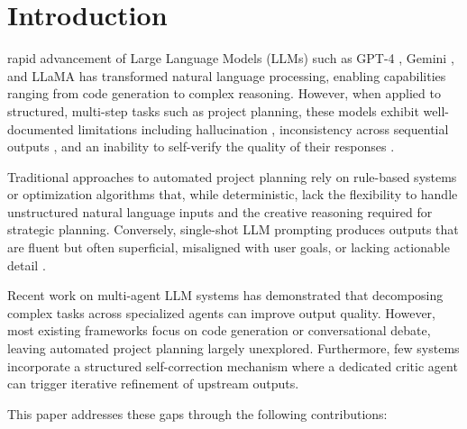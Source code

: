 \documentclass[journal]{IEEEtran}
\begin{document}
\section{Introduction}

 rapid advancement of Large Language Models (LLMs) such as GPT-4 \cite{openai2023gpt4}, Gemini \cite{google2023gemini}, and LLaMA \cite{touvron2023llama} has transformed natural language processing, enabling capabilities ranging from code generation to complex reasoning. However, when applied to structured, multi-step tasks such as project planning, these models exhibit well-documented limitations including hallucination \cite{ji2023survey}, inconsistency across sequential outputs \cite{wang2023selfconsistency}, and an inability to self-verify the quality of their responses \cite{madaan2023selfrefine}.

Traditional approaches to automated project planning rely on rule-based systems or optimization algorithms \cite{kolisch1997psplib} that, while deterministic, lack the flexibility to handle unstructured natural language inputs and the creative reasoning required for strategic planning. Conversely, single-shot LLM prompting produces outputs that are fluent but often superficial, misaligned with user goals, or lacking actionable detail \cite{wei2022chain}.

Recent work on multi-agent LLM systems \cite{wu2023autogen, hong2023metagpt, li2023camel} has demonstrated that decomposing complex tasks across specialized agents can improve output quality. However, most existing frameworks focus on code generation or conversational debate, leaving automated project planning largely unexplored. Furthermore, few systems incorporate a structured self-correction mechanism where a dedicated critic agent can trigger iterative refinement of upstream outputs.

This paper addresses these gaps through the following contributions:
\end{document}
